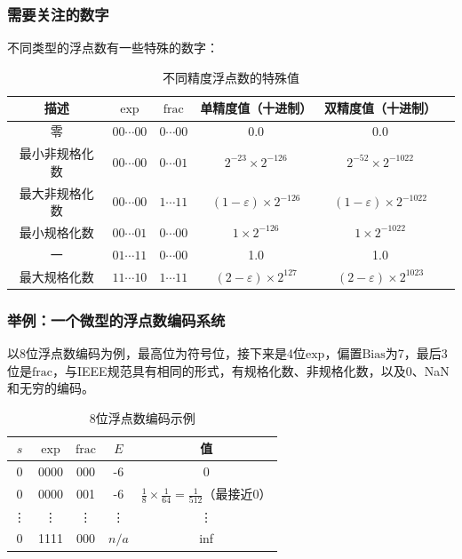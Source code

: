 \subsubsection{需要关注的数字}
不同类型的浮点数有一些特殊的数字：
\begin{table}[h]
    \centering
    \begin{tabular}{|c|c|c|c|c|c|}
        \hline
        描述      & \(\text{exp}\) & \(\text{frac}\) & 单精度值（十进制）                         & 双精度值（十进制）                          \\
        \hline
        零       & \(00\cdots00\) & \(0\cdots00\)   & 0.0                               & 0.0                                \\
        最小非规格化数 & \(00\cdots00\) & \(0\cdots01\)   & \(2^{-23}\times2^{-126}\)         & \(2^{-52}\times2^{-1022}\)         \\
        最大非规格化数 & \(00\cdots00\) & \(1\cdots11\)   & \((1-\varepsilon)\times2^{-126}\) & \((1-\varepsilon)\times2^{-1022}\) \\
        最小规格化数  & \(00\cdots01\) & \(0\cdots00\)   & \(1\times2^{-126}\)               & \(1\times2^{-1022}\)               \\
        一       & \(01\cdots11\) & \(0\cdots00\)   & 1.0                               & 1.0                                \\
        最大规格化数  & \(11\cdots10\) & \(1\cdots11\)   & \((2-\varepsilon)\times2^{127}\)  & \((2-\varepsilon)\times2^{1023}\)  \\
        \hline
    \end{tabular}
    \caption{不同精度浮点数的特殊值}
\end{table}

\subsubsection{举例：一个微型的浮点数编码系统}
以8位浮点数编码为例，最高位为符号位，接下来是4位\(\text{exp}\)，偏置\(\text{Bias}\)为7，最后3位是\(\text{frac}\)，与IEEE规范具有相同的形式，有规格化数、非规格化数，以及0、NaN和无穷的编码。
\begin{table}[h]
    \centering
    \begin{tabular}{|c|c|c|c|c|}
        \hline
        \(s\)  & \(\text{exp}\) & \(\text{frac}\) & \(E\)   & 值                                                     \\
        \hline
        0      & 0000           & 000             & -6      & 0                                                     \\
        0      & 0000           & 001             & -6      & \(\frac{1}{8}\times\frac{1}{64}=\frac{1}{512}\)（最接近0） \\
        \vdots & \vdots         & \vdots          & \vdots  & \vdots                                                \\
        0      & 1111           & 000             & \(n/a\) & inf                                                   \\
        \hline
    \end{tabular}
    \caption{8位浮点数编码示例}
\end{table}

